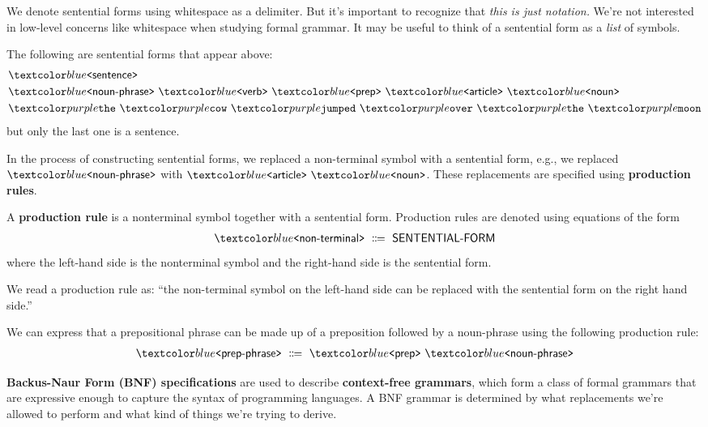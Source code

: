 \begin{remark}
  We denote sentential forms using whitespace as a delimiter.
  But it's important to recognize that \textit{this is just notation.}
  We're not interested in low-level concerns like whitespace when studying formal grammar.
  It may be useful to think of a sentential form as a \textit{list} of symbols.
\end{remark}

\begin{example}
  The following are sentential forms that appear above:
  \begin{align*}
    & \bnfnt{sentence} \\
    & \bnfnt{noun-phrase} \ \bnfnt{verb} \ \bnfnt{prep} \ \bnfnt{article} \ \bnfnt{noun} \\
    & \bnft{the} \ \bnft{cow} \ \bnft{jumped} \ \bnft{over} \ \bnft{the} \ \bnft{moon}
  \end{align*}
  but only the last one is a sentence.
\end{example}
%
In the process of constructing sentential forms, we replaced a non-terminal symbol with a sentential form, e.g., we replaced $\bnfnt{noun-phrase}$ with $\bnfnt{article} \ \bnfnt{noun}$.
These replacements are specified using \textbf{production rules}.

\begin{definition}
  A \textbf{production rule} is a nonterminal symbol together with a sentential form.
  Production rules are denoted using equations of the form
  \begin{align*}
    \bnfnt{non-terminal} \bnfeq \textsf{SENTENTIAL-FORM}
  \end{align*}
  where the left-hand side is the nonterminal symbol and the right-hand side is the sentential form.
\end{definition}
%
We read a production rule as: \enquote{the non-terminal symbol on the left-hand side can be replaced with the sentential form on the right hand side.}
%
\begin{example}
  We can express that a prepositional phrase can be made up of a preposition followed by a noun-phrase using the following production rule:
  \begin{align*}
    \bnfnt{prep-phrase} \bnfeq \bnfnt{prep} \ \bnfnt{noun-phrase}
  \end{align*}
\end{example}
%
\textbf{Backus-Naur Form (BNF) specifications} are used to describe \textbf{context-free grammars}, which form a class of formal grammars that are expressive enough to capture the syntax of programming languages.
A BNF grammar is determined by what replacements we're allowed to perform and what kind of things we're trying to derive.

